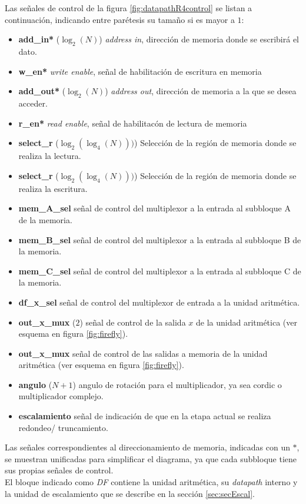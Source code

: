 Las señales de control de la figura \ref{fig:datapathR4control} se listan a continuación, indicando
entre parétesis su tamaño si es mayor a $1$:

\begin{itemize}
  \item \textbf{add\_in*} ($\log_2(N)$) \textit{address in}, dirección de memoria donde se escribirá
  el dato.
  \item \textbf{w\_en*} \textit{write enable}, señal de habilitación de escritura en memoria
  \item \textbf{add\_out*} ($\log_2(N)$) \textit{address out}, dirección de memoria a la que se
  desea acceder.
  \item \textbf{r\_en*} \textit{read enable}, señal de habilitacón de lectura de memoria
  \item \textbf{select\_r} ($\log_2(\log_4(N)))$) Selección de la región de memoria donde se realiza
  la lectura.
  \item \textbf{select\_r} ($\log_2(\log_4(N)))$) Selección de la región de memoria donde se realiza
  la escritura.
  \item \textbf{mem\_A\_sel} señal de control del multiplexor a la entrada al subbloque A de la
  memoria.
  \item \textbf{mem\_B\_sel} señal de control del multiplexor a la entrada al subbloque B de la
  memoria.
  \item \textbf{mem\_C\_sel} señal de control del multiplexor a la entrada al subbloque C de la
  memoria.
  \item \textbf{df\_x\_sel} señal de control del multiplexor de entrada a la unidad aritmética.
  \item \textbf{out\_x\_mux} ($2$) señal de control de la salida $x$ de la unidad aritmética (ver
  esquema en figura \ref{fig:firefly}).
  \item \textbf{out\_x\_mux} señal de control de las salidas a memoria de la unidad aritmética (ver
  esquema en figura \ref{fig:firefly}).
  \item \textbf{angulo} ($N+1$) angulo de rotación para el multiplicador, ya sea cordic o
  multiplicador complejo.
  \item \textbf{escalamiento} señal de indicación de que en la etapa actual se realiza
  redondeo/ truncamiento. 
\end{itemize}

Las señales correspondientes al direccionamiento de memoria, indicadas con un $*$, se muestran
unificadas para simplificar el diagrama, ya que cada subbloque tiene sus propias señales de
control.\\
El bloque indicado como \textit{DF} contiene la unidad aritmética, su \textit{datapath} interno y la
unidad de escalamiento que se describe en la sección \ref{sec:secEscal}.

